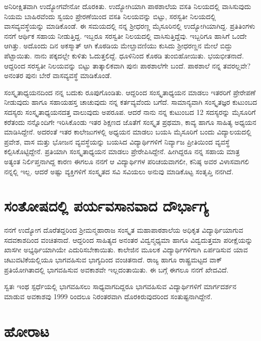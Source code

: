 {ಅನಿರೀಕ್ಷಿತವಾಗಿ ಉದ್ಯೋಗವೇನೋ ದೊರಕಿತು.  ಉದ್ಯೋಗಿಯಾಗಿ ಪಾಠಶಾಲೆಯ ವಸತಿ ನಿಲಯದಲ್ಲಿ ವಾಸಿಸುವುದು ನಿಯಮ ಬಾಹಿರವೆಂದು ಸ್ವಯಂ ಪ್ರೇರಣೆಯಿಂದ ವಸತಿ ನಿಲಯವನ್ನು ಬಿಟ್ಟು, ಸರಸ್ವತೀ ನಿಲಯದಲ್ಲಿ ವಾಸವ್ಯವಸ್ಥೆಯನ್ನು ಮಾಡಿಕೊಂಡೆ. ಈ ಸಮಯದಲ್ಲಿ ನನ್ನ ಶ್ರೀಧರಣ್ಣ ಮೈಸೂರಿನಲ್ಲಿ ಉದ್ಯೋಗಿಯಾಗಿದ್ದ.  ಪ್ರತಿತಿಂಗಳು ನನಗೆ ಆರ್ಥಿಕ ಸಹಾಯ ನೀಡುತ್ತಿದ್ದ.  ಇಬ್ಬರೂ ಸರಸ್ವತೀ ನಿಲಯದಲ್ಲಿ ವಾಸಿಸುತ್ತಿದ್ದೆವು.  ಇಬ್ಬರಿಗೂ ಹಾಸಿಗೆ ಒಂದೇ ಆಗಿತ್ತು.  ಅದೊಂದು ದಿನ ಅಕಸ್ಮಾತ್ ಆಗಿ ಕೊಠಡಿಯ ಮೇಲ್ಚಾವಣಿಯು ಕುಸಿದು ಶ್ರೀಧರಣ್ಣನ ಮೇಲೆ ಬಿದ್ದು ಪೆಟ್ಟಾಯಿತು. ನಾನು ಪಕ್ಕದಲ್ಲೇ ಕುಳಿತು ಓದುತ್ತಲಿದ್ದೆ.  ಧೂಳಿನಿಂದ ಕೊಠಡಿ ತುಂಬಿಹೋಯಿತು. ಭಯಭೀತನಾದೆ. ಆದ್ದರಿಂದ ಸರಸ್ವತೀ ನಿಲಯವನ್ನು ಬಿಟ್ಟು ತಾತ್ಕಾಲಿಕವಾಗಿ ಪುನಃ ಪಾಠಶಾಲೆಗೇ ಬಂದೆ. ಪಾಠಶಾಲೆ ನನ್ನ ತವರಲ್ಲವೇ? ಅನಂತರ ಪುನಃ ಬೇರೆ ವಾಸವ್ಯವಸ್ಥೆ ಮಾಡಿಕೊಂಡೆ. 

ಸಂಸ್ಕೃತಾಧ್ಯಯನದಿಂದ ನನ್ನ ಬದುಕು ರೂಪುಗೊಂಡಿತು.  ಆದ್ದರಿಂದ ಸಂಸ್ಕೃತಾಧ್ಯಯನ ಮಾಡಲು ಇತರರಿಗೆ ಪ್ರೇರೇಪಣೆ ನೀಡುವುದು ಹಾಗೂ ಸಹಾಯಹಸ್ತ ಚಾಚುವುದು ನನ್ನ ಕರ್ತವ್ಯವೆಂದು ಬಗೆದೆ.  ಸಾಮಾನ್ಯವಾಗಿ  ಸಂಸ್ಕೃತಜ್ಞರ ಕುಟುಂಬದ ಸದಸ್ಯರು ಸಂಸ್ಕೃತಾಧ್ಯಯನದತ್ತ ವಾಲುವುದು ಅಪರೂಪ.  ಆದರೆ ನಾನು ನನ್ನ ಕುಟುಂಬದ 12 ಸದಸ್ಯರನ್ನು ಮೈಸೂರಿಗೆ ಕರೆತಂದು ನನ್ನೊಂದಿಗೇ ಇರಿಸಿಕೊಂಡು ಇತರ ಶಿಕ್ಷಣದ ಜೊತೆಗೆ ಸಂಸ್ಕೃತ ಪ್ರಥಮಾ, ಕಾವ್ಯ ಹಾಗೂ ಸಾಹಿತ್ಯ ಅಧ್ಯಯನ ಮಾಡಿಸಿದ್ದೇನೆ.  ಅದರಂತೆ ಇತರ ಕಾಲೇಜುಗಳಲ್ಲಿ ಅಧ್ಯಯನ ಮಾಡಲು ಬಯಸಿ ಮೈಸೂರಿಗೆ ಬಂದು ವಿದ್ಯಾಲಯದಲ್ಲಿ ಪ್ರವೇಶ, ವಾಸ ಮತ್ತು ಭೋಜನ ವ್ಯವಸ್ಥೆಯನ್ನು ಬಯಸಿದ ವಿದ್ಯಾರ್ಥಿಗಳಿಗೆ ನಿರ್ವ್ಯಾಜ ಪ್ರೀತಿಯಿಂದ ವ್ಯವಸ್ಥೆ ಕಲ್ಪಿಸಿಕೊಟ್ಟಿದ್ದೇನೆ.  ಪ್ರತಿಯಾಗಿ ಸಂಸ್ಕೃತಾಧ್ಯಯನ ಮಾಡಲು ಪ್ರೇರೇಪಿಸಿದ್ದೇನೆ.  ಹೀಗಿದ್ದರೂ ನನ್ನ ಸಹಾಯ ಮಾತ್ರ ಅತ್ಯಂತ ನಿರ್ಲಿಪ್ತನಾಗಿದ್ದ ಕಾರಣ ಈಗಲೂ ನನಗೆ ಆ ವಿದ್ಯಾರ್ಥಿಗಳ ಪರಿಚಯವಾಗಲೀ, ಕನಿಷ್ಠ ಅವರ ವಿಳಾಸವಾಗಲಿ ನನ್ನಲ್ಲಿ ಇಲ್ಲ.  ಆದರೆ ಅಷ್ಟು ವ್ಯಕ್ತಿಗಳಿಗೆ ಸಂಸ್ಕೃತದ ಸವಿ ಸವಿಯಲು ಅನುವು ಮಾಡಿಕೊಟ್ಟ ಸಂತೃಪ್ತಿ ನನಗಿದೆ.  

\section*{ಸಂತೋಷದಲ್ಲಿ ಪರ್ಯವಸಾನವಾದ ದೌರ್ಭಾಗ್ಯ}

ನನಗೆ ಉದ್ಯೋಗ ದೊರೆತದ್ದರಿಂದ ಶ್ರೀಮನ್ಮಹಾರಾಜ ಸಂಸ್ಕೃತ ಮಹಾಪಾಠಶಾಲೆಯ ಅಧಿಕೃತ ವಿದ್ಯಾರ್ಥಿಯಾಗುವ ಸದವಕಾಶದಿಂದ ವಂಚಿತನಾದೆ. ಆದ್ದರಿಂದ ಸಾಹಿತ್ಯದ ಅನಂತರ ವಿದ್ವನ್ಮಧ್ಯಮಾ ಹಾಗೂ ವಿದ್ವದುತ್ತಮಾ ಪರೀಕ್ಷೆಯನ್ನು ಖಾಸಗೀ ಅಭ್ಯರ್ಥಿಯಾಗಿಯೇ ಎದುರಿಸಬೇಕಾಯಿತು.  ಕಾಲೇಜಿನ ಮೂಲಕ ವಿದ್ಯಾರ್ಥಿಗಳಿಗಾಗಿ ಏರ್ಪಡಿಸುವ ಯಾವ ಚಟುವಟಿಕೆಯಲ್ಲಿಯೂ ಭಾಗವಹಿಸುವ ಭಾಗ್ಯದಿಂದ ವಂಚಿತನಾದೆ.  ರಾಜ್ಯ ಹಾಗೂ ರಾಷ್ಟ್ರಮಟ್ಟದ ವಾಕ್ ಪ್ರತಿಯೋಗಿತಾದಲ್ಲಿ ಭಾಗವಹಿಸುವ ಅವಕಾಶವೇ ಇಲ್ಲದಂತಾಯಿತು.  ಈ ಬಗ್ಗೆ ಈಗಲೂ ನನಗೆ ಖೇದವಿದೆ.  

ಸ್ವತಃ ಇಂಥ ಸ್ಪರ್ಧೆಯಲ್ಲಿ ಭಾಗವಹಿಸಲು ಸಾಧ್ಯವಾಗದಿದ್ದರೂ ಭಾಗವಹಿಸುವ ವಿದ್ಯಾರ್ಥಿಗಳಿಗೆ ಮಾರ್ಗದರ್ಶನ ಮಾಡುವ ಅವಕಾಶವು 1999 ರಿಂದಲೂ ನಿರಂತರವಾಗಿ ದೊರಕಿರುವುದರಿಂದ ಸಂತುಷ್ಟನಾಗಿದ್ದೇನೆ. 

\section*{ಹೋರಾಟ}

}
